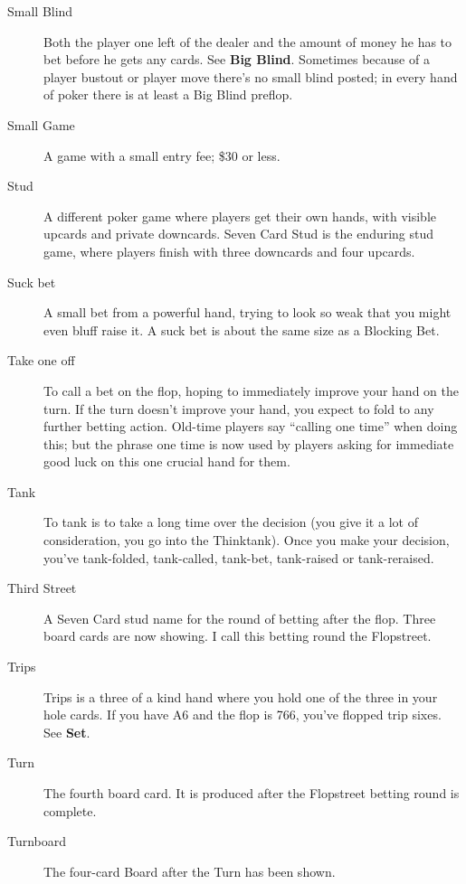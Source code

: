 \begin{description}
\item[Small Blind] Both the player one left of the dealer and the
amount of money he has to bet before he gets any cards. See
\textbf{Big Blind}. Sometimes because of a player bustout or player
move there's no small blind posted; in every hand of poker there is at
least a Big Blind preflop.

\item[Small Game] A game with a small entry fee; \$30 or less.

\item[Stud] A different poker game where players get their own hands,
with visible upcards and private downcards. Seven Card Stud is the
enduring stud game, where players finish with three downcards and four
upcards.

\item[Suck bet] A small bet from a powerful hand, trying to look so
weak that you might even bluff raise it. A suck bet is about the same
size as a Blocking Bet.

\item[Take one off] To call a bet on the flop, hoping to immediately
improve your hand on the turn. If the turn doesn't improve your hand,
you expect to fold to any further betting action. Old-time players say
``calling one time'' when doing this; but the phrase one time is now
used by players asking for immediate good luck on this one crucial
hand for them.

\item[Tank] To tank is to take a long time over the decision
(you give it a lot of consideration, you go into the Thinktank).
Once you make your decision, you've tank-folded, tank-called, tank-bet,
tank-raised or tank-reraised.

\item[Third Street] A Seven Card stud name for the round of betting
after the flop. Three board cards are now showing. I call this betting
round the Flopstreet.

\item[Trips] Trips is a three of a kind hand where you hold one of the
three in your hole cards. If you have A6 and the flop is 766, you've
flopped trip sixes. See \textbf{Set}.

\item[Turn] The fourth board card. It is produced after the Flopstreet
betting round is complete.

\item[Turnboard] The four-card Board after the Turn has been shown.


\end{description}
